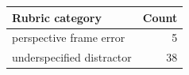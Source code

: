 \begin{tabular}{lr}
\toprule
Rubric category & Count \\
\midrule
perspective frame error & 5 \\
underspecified distractor & 38 \\
\bottomrule
\end{tabular}

